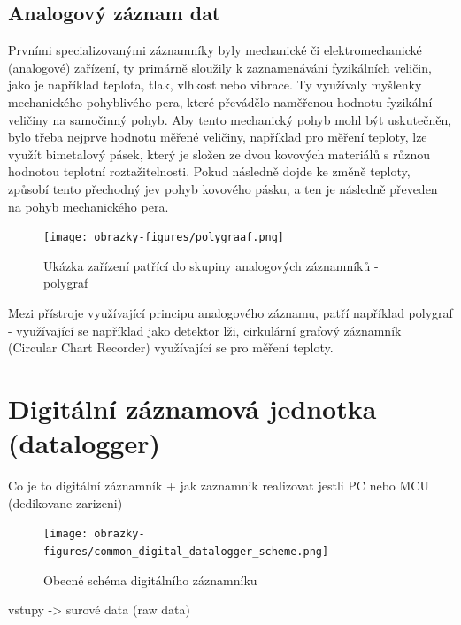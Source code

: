   
\subsection{Analogový záznam dat} %
\label{moznosti_zaznamu_dat}
Prvními specializovanými záznamníky byly mechanické či elektromechanické (analogové) zařízení, ty primárně sloužily k zaznamenávání fyzikálních veličin, 
jako je například teplota, tlak, vlhkost nebo vibrace. Ty využívaly myšlenky mechanického pohyblivého pera, které převádělo naměřenou hodnotu fyzikální 
veličiny na samočinný pohyb. Aby tento mechanický pohyb mohl být uskutečněn, bylo třeba nejprve hodnotu měřené veličiny, například pro měření teploty, lze 
využít bimetalový pásek, který je složen ze dvou kovových materiálů s různou hodnotou teplotní roztažitelnosti. Pokud následně dojde ke změně teploty, způsobí 
tento přechodný jev pohyb kovového pásku, a ten je následně převeden na pohyb mechanického pera.


\begin{figure}[h] %
    \centering
    \texttt{[image: obrazky-figures/polygraaf.png]}
    \caption{Ukázka zařízení patřící do skupiny analogových záznamníků - polygraf \cite{polygraph_picture}}
    \label{fig:polygraaf}
\end{figure}

Mezi přístroje využívající principu analogového záznamu, patří například polygraf - využívající se například jako detektor lži, cirkulární grafový záznamník 
(Circular Chart Recorder) využívající se pro měření teploty.


\section{Digitální záznamová jednotka (datalogger)}
\label{digitalni_zaznamnik}
Co je to digitální záznamník + jak zaznamnik realizovat jestli PC nebo MCU (dedikovane zarizeni)

\begin{figure}[h] %
    \centering
    \texttt{[image: obrazky-figures/common\_digital\_datalogger\_scheme.png]}
    \caption{Obecné schéma digitálního záznamníku}
    \label{fig:polygraaf}
\end{figure}
vstupy -> surové data (raw data)

